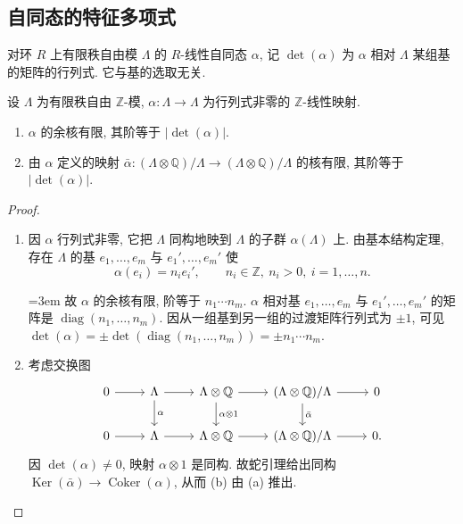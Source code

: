 \subsection*{自同态的特征多项式}

对环 $R$ 上有限秩自由模 $\Lambda$ 的 $R$-线性自同态 $\alpha$, 记 $\det(\alpha)$ 为 $\alpha$ 相对 $\Lambda$ 某组基的矩阵的行列式. 它与基的选取无关.

\begin{lemma} \label{thm:3.3.20} 
设 $\Lambda$ 为有限秩自由 $\mathbb{Z}$-模, $\alpha\colon\Lambda\to\Lambda$ 为行列式非零的 $\mathbb{Z}$-线性映射.
\begin{enumerate}[label=\textup{(\alph*)}]
\item $\alpha$ 的余核有限, 其阶等于 $|\det(\alpha)|$.
\item 由 $\alpha$ 定义的映射 $\bar{\alpha}\colon(\Lambda\otimes\mathbb{Q})/\Lambda\to(\Lambda\otimes\mathbb{Q})/\Lambda$ 的核有限, 其阶等于 $|\det(\alpha)|$.
\end{enumerate}
\end{lemma}

\begin{proof}\begin{enumerate}[label=\textup{(\alph*)}]

\item 因 $\alpha$ 行列式非零, 它把 $\Lambda$ 同构地映到 $\Lambda$ 的子群 $\alpha(\Lambda)$ 上. 由基本结构定理, 存在 $\Lambda$ 的基 $e_1, \dots, e_m$ 与 $e_1', \dots, e_m'$ 使
\[
\alpha(e_i) = n_ie_i', \qquad n_i\in\mathbb{Z}, \ n_i > 0, \ i = 1, \dots, n.
\]
{\emergencystretch=3em 故 $\alpha$ 的余核有限, 阶等于 $n_1\cdots n_m$. $\alpha$ 相对基 $e_1, \dots, e_m$ 与 $e_1', \dots, e_m'$ 的矩阵是 $\operatorname{diag}(n_1, \dots, n_m)$. 因从一组基到另一组的过渡矩阵行列式为 $\pm 1$, 可见 $\det(\alpha) = \pm\det(\operatorname{diag}(n_1, \dots, n_m)) = \pm n_1\cdots n_m$.\par}

\item 考虑交换图
\[
\begin{tikzcd}
0 \ar[r] &
\Lambda \ar[r] \ar[d, "\alpha"] &
\Lambda \otimes \mathbb{Q} \ar[r] \ar[d, "\alpha \otimes 1"] &
(\Lambda \otimes \mathbb{Q})/\Lambda \ar[r] \ar[d, "\bar{\alpha}"] &
0 \\
0 \ar[r] &
\Lambda \ar[r] &
\Lambda \otimes \mathbb{Q} \ar[r] &
(\Lambda \otimes \mathbb{Q})/\Lambda \ar[r] &
0.
\end{tikzcd}
\]
因 $\det(\alpha)\neq 0$, 映射 $\alpha\otimes 1$ 是同构. 故蛇引理给出同构 $\operatorname{Ker}(\bar{\alpha})\to\operatorname{Coker}(\alpha)$, 从而 (b) 由 (a) 推出.


\end{enumerate}\end{proof}

